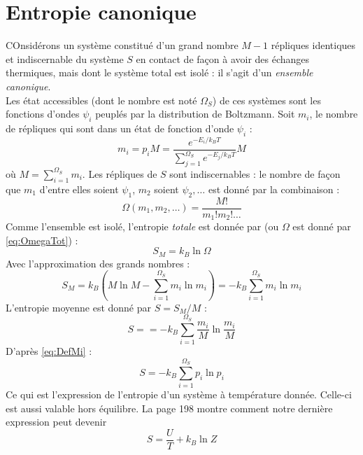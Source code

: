 \documentclass	[11pt, a4paper, openany]{book}
\begin{document}
\section{Entropie canonique}
COnsidérons un système constitué d'un grand nombre $M-1$ répliques identiques et 
indiscernable du système $S$ en contact de façon à avoir des échanges thermiques, mais dont
le système total est isolé : il s'agit d'un \textit{ensemble canonique}.\\
Les état accessibles (dont le nombre est noté $\Omega_S$) de ces systèmes sont les fonctions 
d'ondes $\psi_i$ peuplés par la distribution de Boltzmann. Soit $m_i$, le nombre de répliques
qui sont dans un état de fonction d'onde $\psi_i$ :
\begin{equation}
m_i = p_i M = \dfrac{e^{-E_i/k_BT}}{\sum_{j=1}^{\Omega_S} e^{-E_j/k_BT}}M
\label{eq:DefMi}
\end{equation}
où $M = \sum_{i=1}^{\Omega_S} m_i$. Les répliques de $S$ sont indiscernables : le nombre de 
façon que $m_1$ d'entre elles soient $\psi_1$, $m_2$ soient $\psi_2,\dots$ est donné par 
la combinaison :
\begin{equation}
\Omega(m_1,m_2,\dots) = \frac{M!}{m_1!m_2!\dots}
\label{eq:OmegaTot}
\end{equation}
Comme l'ensemble est isolé, l'entropie \textit{totale} est donnée par (ou $\Omega$ est donné
par \autoref{eq:OmegaTot}) :
\begin{equation}
S_M = k_B\ln\Omega
\end{equation}
Avec l'approximation des grands nombres :
\begin{equation}
S_M = k_B\left(M\ln M - \sum_{i=1}^{\Omega_S} m_i\ln m_i\right) = -k_B\sum_{i=1}^{\Omega_S} m_i
\ln m_i
\end{equation}
L'entropie moyenne est donné par $S = S_M/M$ :
\begin{equation}
S = = -k_B\sum_{i=1}^{\Omega_S} \frac{m_i}{M}\ln\frac{m_i}{M}
\end{equation}
D'après \autoref{eq:DefMi} :
\begin{equation}
S = -k_B\sum_{i=1}^{\Omega_S} p_i\ln p_i
\end{equation}
Ce qui est l'expression de l'entropie d'un système à température donnée. Celle-ci est aussi
valable hors équilibre. La page 198 montre comment notre dernière expression peut devenir 
\begin{equation}
S = \frac{U}{T} + k_B\ln Z
\label{eq:AutreRel}
\end{equation}
\end{document}

